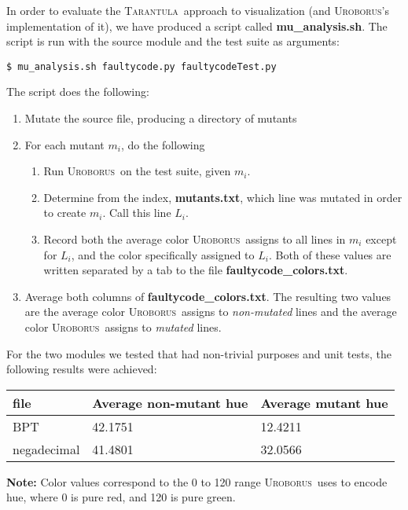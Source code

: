 \documentclass[english]{article}
\newcommand{\Uro}{\textsc{Uroborus}} \newcommand{\Taran}{\textsc{Tarantula}}
\begin{document}
In order to evaluate the \Taran\ approach to visualization (and \Uro's implementation of it), 
we have produced a script called
\textbf{mu\_analysis.sh}. The script is run with the source module and the test suite as arguments:
\begin{verbatim}
$ mu_analysis.sh faultycode.py faultycodeTest.py
\end{verbatim}
The script does the following:
\begin{enumerate}
\item Mutate the source file, producing a directory of mutants
\item For each mutant $m_i$, do the following
    \begin{enumerate}
    \item Run \Uro\ on the test suite, given $m_i$.
    \item Determine from the index, \textbf{mutants.txt}, which line was mutated in order to create
    $m_i$. Call this line $L_i$.
    \item Record both the average color \Uro\ assigns to all lines in $m_i$ except for $L_i$, and
    the color specifically assigned to $L_i$. Both of these values are written separated by a tab 
    to the file \textbf{faultycode\_colors.txt}.
    \end{enumerate}
\item Average both columns of \textbf{faultycode\_colors.txt}. The resulting two values are the
average color \Uro\ assigns to \emph{non-mutated} lines and the average color \Uro\ assigns to
\emph{mutated} lines. 
\end{enumerate}

For the two modules we tested that had non-trivial purposes and unit tests, the following
results were achieved: 

\begin{center}
\begin{tabular}{|l|l|l|}
    \hline
    \textbf{file} & \textbf{Average non-mutant hue} & \textbf{Average mutant hue} \\
    \hline
    BPT & 42.1751  & 12.4211 \\
    \hline
    negadecimal & 41.4801   &  32.0566 \\
    \hline
\end{tabular}
\end{center}
\textbf{Note:} Color values correspond to the 0 to 120 range \Uro\ uses to encode hue, where
0 is pure red, and 120 is pure green.





\end{document}
